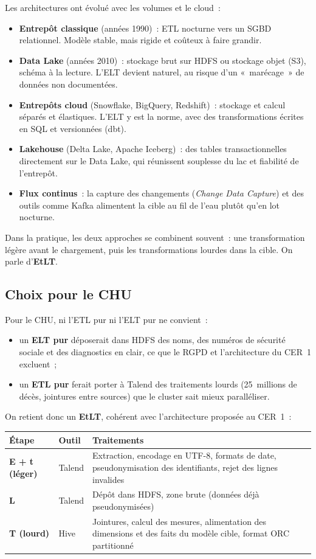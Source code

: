\noindent Les architectures ont évolué avec les volumes et le cloud~:
\begin{itemize}
	\item \textbf{Entrepôt classique} (années 1990)~: ETL nocturne vers un SGBD relationnel. Modèle stable, mais rigide et coûteux à faire grandir.
	\item \textbf{Data Lake} (années 2010)~: stockage brut sur HDFS ou stockage objet (S3), schéma à la lecture. L'ELT devient naturel, au risque d'un «~marécage~» de données non documentées.
	\item \textbf{Entrepôts cloud} (Snowflake, BigQuery, Redshift)~: stockage et calcul séparés et élastiques. L'ELT y est la norme, avec des transformations écrites en SQL et versionnées (dbt).
	\item \textbf{Lakehouse} (Delta Lake, Apache Iceberg)~: des tables transactionnelles directement sur le Data Lake, qui réunissent souplesse du lac et fiabilité de l'entrepôt.
	\item \textbf{Flux continus}~: la capture des changements (\textit{Change Data Capture}) et des outils comme Kafka alimentent la cible au fil de l'eau plutôt qu'en lot nocturne.
\end{itemize}
Dans la pratique, les deux approches se combinent souvent~: une transformation légère avant le chargement, puis les transformations lourdes dans la cible. On parle d'\textbf{EtLT}.

\subsection{Choix pour le CHU}

\noindent Pour le CHU, ni l'ETL pur ni l'ELT pur ne convient~:
\begin{itemize}
	\item un \textbf{ELT pur} déposerait dans HDFS des noms, des numéros de sécurité sociale et des diagnostics en clair, ce que le RGPD et l'architecture du CER~1 excluent~;
	\item un \textbf{ETL pur} ferait porter à Talend des traitements lourds (25~millions de décès, jointures entre sources) que le cluster sait mieux paralléliser.
\end{itemize}

\noindent On retient donc un \textbf{EtLT}, cohérent avec l'architecture proposée au CER~1~:

\begin{center}
\begin{tabularx}{\textwidth}{>{\bfseries}l l >{\raggedright\arraybackslash}X}
\toprule
Étape & Outil & Traitements \\
\midrule
E + t (léger) & Talend & Extraction, encodage en UTF-8, formats de date, pseudonymisation des identifiants, rejet des lignes invalides \\
L & Talend & Dépôt dans HDFS, zone brute (données déjà pseudonymisées) \\
T (lourd) & Hive & Jointures, calcul des mesures, alimentation des dimensions et des faits du modèle cible, format ORC partitionné \\
\bottomrule
\end{tabularx}
\end{center}

